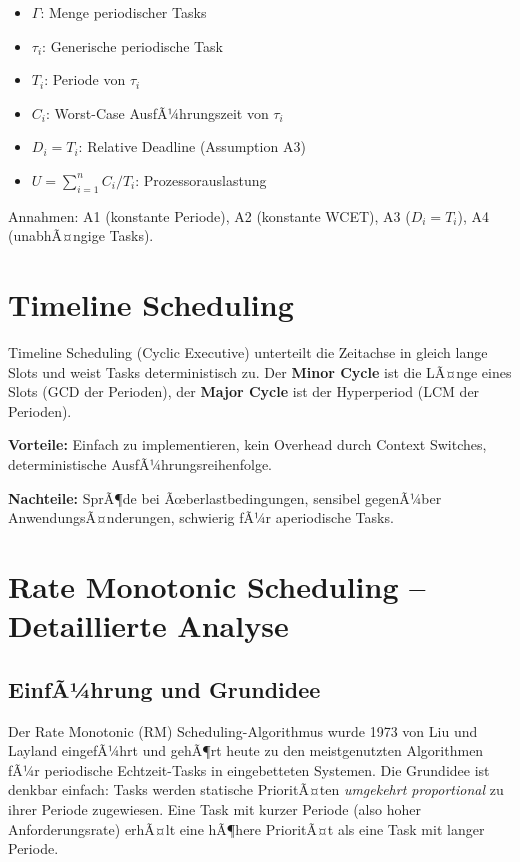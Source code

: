 ﻿\documentclass[a4paper,12pt]{report}
\theoremstyle{definition}
\begin{document}
\begin{itemize}
	\item $\Gamma$: Menge periodischer Tasks
	\item $\tau_i$: Generische periodische Task
	\item $T_i$: Periode von $\tau_i$
	\item $C_i$: Worst-Case AusfÃ¼hrungszeit von $\tau_i$
	\item $D_i = T_i$: Relative Deadline (Assumption A3)
	\item $U = \sum_{i=1}^{n} C_i/T_i$: Prozessorauslastung
\end{itemize}

Annahmen: A1 (konstante Periode), A2 (konstante WCET), A3 ($D_i = T_i$),
A4 (unabhÃ¤ngige Tasks).

\section{Timeline Scheduling}

Timeline Scheduling (Cyclic Executive) unterteilt die Zeitachse in gleich
lange Slots und weist Tasks deterministisch zu. Der \textbf{Minor Cycle} ist die
LÃ¤nge eines Slots (GCD der Perioden), der \textbf{Major Cycle} ist der
Hyperperiod (LCM der Perioden).

\textbf{Vorteile:} Einfach zu implementieren, kein Overhead durch Context Switches,
deterministische AusfÃ¼hrungsreihenfolge.

\textbf{Nachteile:} SprÃ¶de bei Ãœberlastbedingungen, sensibel gegenÃ¼ber
AnwendungsÃ¤nderungen, schwierig fÃ¼r aperiodische Tasks.

\section{Rate Monotonic Scheduling -- Detaillierte Analyse}

\subsection{EinfÃ¼hrung und Grundidee}

Der Rate Monotonic (RM) Scheduling-Algorithmus wurde 1973 von Liu und Layland
eingefÃ¼hrt \cite{Liu1973} und gehÃ¶rt heute zu den meistgenutzten Algorithmen fÃ¼r
periodische Echtzeit-Tasks in eingebetteten Systemen. Die Grundidee ist denkbar
einfach: Tasks werden statische PrioritÃ¤ten \emph{umgekehrt proportional} zu ihrer
Periode zugewiesen. Eine Task mit kurzer Periode (also hoher Anforderungsrate) erhÃ¤lt
eine hÃ¶here PrioritÃ¤t als eine Task mit langer Periode.
\end{document}
